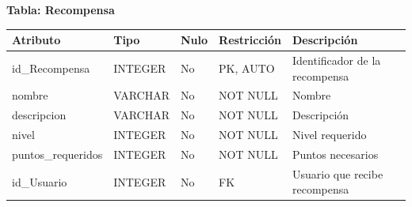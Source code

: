 \documentclass[12pt]{article}
\begin{document}
\textbf{Tabla: Recompensa}
\begin{table}[H]
\centering
\begin{tabular}{|p{3cm}|p{2cm}|p{1cm}|p{2cm}|p{5cm}|}
\hline
\textbf{Atributo} & \textbf{Tipo} & \textbf{Nulo} & \textbf{Restricción} & \textbf{Descripción} \\ \hline
id\_Recompensa & INTEGER & No & PK, AUTO & Identificador de la recompensa \\ \hline
nombre & VARCHAR & No & NOT NULL & Nombre \\ \hline
descripcion & VARCHAR & No & NOT NULL & Descripción \\ \hline
nivel & INTEGER & No & NOT NULL & Nivel requerido \\ \hline
puntos\_requeridos & INTEGER & No & NOT NULL & Puntos necesarios \\ \hline
id\_Usuario & INTEGER & No & FK & Usuario que recibe recompensa \\ \hline
\end{tabular}
\end{table}
\end{document}
